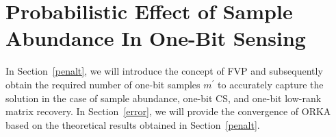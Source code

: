 \documentclass[12pt,draftcls,onecolumn]{IEEEtran}
\begin{document}
\section{Probabilistic Effect of Sample Abundance In One-Bit Sensing}
\label{ada_thresh_prob}
In Section~\ref{penalt}, we will introduce the concept of FVP and subsequently obtain the required number of one-bit samples $m^{\prime}$ to accurately capture the solution in the case of sample abundance, one-bit CS, and one-bit low-rank matrix recovery. In Section~\ref{error}, we will provide the convergence of ORKA based on the theoretical results obtained in Section~\ref{penalt}.
\end{document}
